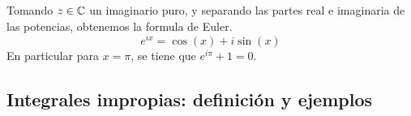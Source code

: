 \begin{prop*}
	Tomando $z \in \mathbb{C}$ un imaginario puro, y separando las partes real e imaginaria
	de las potencias, obtenemos la formula de Euler.
	\[
		e^{ix} = \cos(x) + i\sin(x)
	\]
	En particular para $x = \pi$, se tiene que $e^{i\pi} + 1 = 0$.
\end{prop*}

\subsection{Integrales impropias: definición y ejemplos}
